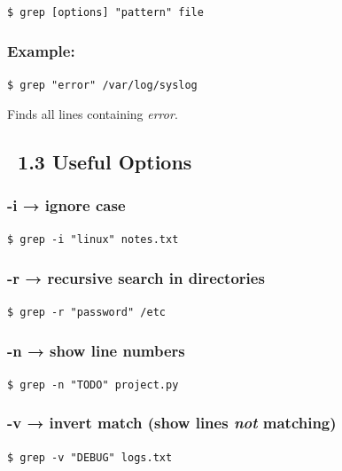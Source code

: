 \documentclass[12pt]{article}
\newcommand{\targeticon}{\faBullseye}
\begin{document}
\begin{highlightbox}
\texttt{\$ grep [options] "pattern" file}
\end{highlightbox}

\subsubsection*{Example:}

\begin{highlightbox}
\texttt{\$ grep "error" /var/log/syslog}
\end{highlightbox}

Finds all lines containing \textit{error}.

\subsection*{\targeticon\ 1.3 Useful Options}

\subsubsection*{\textbf{-i} → ignore case}

\begin{highlightbox}
\texttt{\$ grep -i "linux" notes.txt}
\end{highlightbox}

\subsubsection*{\textbf{-r} → recursive search in directories}

\begin{highlightbox}
\texttt{\$ grep -r "password" /etc}
\end{highlightbox}

\subsubsection*{\textbf{-n} → show line numbers}

\begin{highlightbox}
\texttt{\$ grep -n "TODO" project.py}
\end{highlightbox}

\subsubsection*{\textbf{-v} → invert match (show lines \textit{not} matching)}

\begin{highlightbox}
\texttt{\$ grep -v "DEBUG" logs.txt}
\end{highlightbox}
\end{document}
